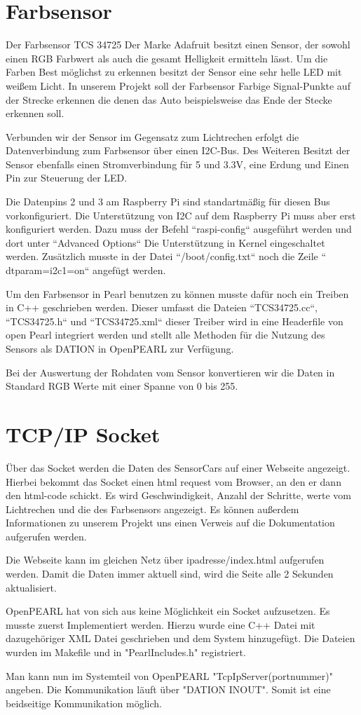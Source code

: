 \section{Farbsensor}
Der Farbsensor TCS 34725 Der Marke Adafruit besitzt einen Sensor, der sowohl einen RGB Farbwert als auch die gesamt Helligkeit ermitteln lässt. Um die Farben Best möglichst zu erkennen besitzt der Sensor eine sehr helle LED mit weißem Licht. In unserem Projekt soll der Farbsensor Farbige Signal-Punkte auf der Strecke erkennen die denen das Auto beispielsweise das Ende der Stecke erkennen soll. 

Verbunden wir der Sensor im Gegensatz zum Lichtrechen erfolgt die Datenverbindung zum Farbsensor über einen I2C-Bus. Des Weiteren Besitzt der Sensor ebenfalls einen Stromverbindung für 5 und 3.3V, eine Erdung und Einen Pin zur Steuerung der LED.

Die Datenpins 2 und 3 am Raspberry Pi sind standartmäßig für diesen Bus vorkonfiguriert. Die Unterstützung von I2C auf dem Raspberry Pi muss aber erst konfiguriert werden. Dazu muss der Befehl “raspi-config“ ausgeführt werden und dort unter “Advanced Options“ Die Unterstützung in Kernel eingeschaltet werden. Zusätzlich musste in der Datei “/boot/config.txt“ noch die Zeile “ dtparam=i2c1=on“ angefügt werden.

Um den Farbsensor in Pearl benutzen zu können musste dafür noch ein Treiben in C++ geschrieben werden. Dieser umfasst die Dateien “TCS34725.cc“, “TCS34725.h“ und “TCS34725.xml“ dieser Treiber wird in eine Headerfile von open Pearl integriert werden und stellt alle Methoden für die Nutzung des Sensors als DATION in OpenPEARL zur Verfügung.

Bei der Auswertung der Rohdaten vom Sensor konvertieren wir die Daten in Standard RGB Werte mit einer Spanne von 0 bis 255.

\section{TCP/IP Socket}
Über das Socket werden die Daten des SensorCars auf einer Webseite angezeigt. Hierbei bekommt das Socket einen html request vom Browser, an den er dann den html-code schickt. Es wird Geschwindigkeit, Anzahl der Schritte, werte vom Lichtrechen und die des Farbsensors angezeigt. Es können außerdem Informationen zu unserem Projekt uns einen Verweis auf die Dokumentation aufgerufen werden. 

Die Webseite kann im gleichen Netz über ipadresse/index.html aufgerufen werden. Damit die Daten immer aktuell sind, wird die Seite alle 2 Sekunden aktualisiert.

OpenPEARL hat von sich aus keine Möglichkeit ein Socket aufzusetzen. Es musste zuerst Implementiert werden. Hierzu wurde eine C++ Datei mit dazugehöriger XML Datei geschrieben und dem System hinzugefügt. Die Dateien wurden im Makefile und in "PearlIncludes.h" registriert. 

Man kann nun im Systemteil von OpenPEARL "TcpIpServer(portnummer)" angeben. Die Kommunikation läuft über "DATION INOUT". Somit ist eine beidseitige Kommunikation möglich. 
